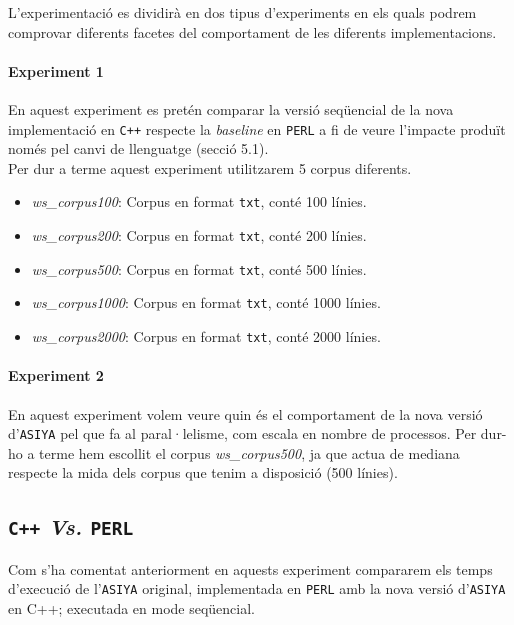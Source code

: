 \documentclass[11pt,a4paper]{article}
\begin{document}
L'experimentació es dividirà en dos tipus d'experiments en els quals podrem comprovar diferents facetes del comportament de les diferents implementacions.
\\

\paragraph{Experiment 1} En aquest experiment es pretén comparar la versió seqüencial de la nova implementació en \texttt{C++} respecte la \textit{baseline} en \texttt{PERL} a fi de veure l'impacte produït només pel canvi de llenguatge (secció 5.1).
\\

Per dur a terme aquest experiment utilitzarem 5 corpus diferents.
\begin{itemize}

\item \textit{ws\_corpus100}: Corpus en format \texttt{txt}, conté 100 línies.

\item \textit{ws\_corpus200}: Corpus en format \texttt{txt}, conté 200 línies.

\item \textit{ws\_corpus500}: Corpus en format \texttt{txt}, conté 500 línies.

\item \textit{ws\_corpus1000}: Corpus en format \texttt{txt}, conté 1000 línies.

\item \textit{ws\_corpus2000}: Corpus en format \texttt{txt}, conté 2000 línies.

\end{itemize}


\paragraph{Experiment 2} En aquest experiment volem veure quin és el comportament de la nova versió d'\texttt{ASIYA} pel que fa al paral·lelisme, com escala en nombre de processos. Per dur-ho a terme hem escollit el corpus  \textit{ws\_corpus500}, ja que actua de mediana respecte la mida dels corpus que tenim a disposició (500 línies).
\\

\subsection{\texttt{C++} \emph{Vs.} \texttt{PERL}}
Com s'ha comentat anteriorment en aquests experiment compararem els temps d'execució de l'\texttt{ASIYA} original, implementada en \texttt{PERL} amb la nova versió d'\texttt{ASIYA} en C++; executada en mode seqüencial.
\\
\end{document}
